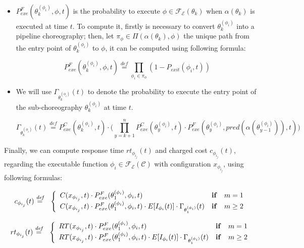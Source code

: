 \documentclass[12pt,a4paper]{report}
\newcommand{\mathDef}{\overset{\textit{def}}{=}}
\begin{document}
\begin{itemize}
	
	\item $P_{exe}^F(\theta^{(\phi_i)}_k, \phi, t)$ is the probability to execute $\phi \in \mathscr{F_E}(\theta_k)$ when $\alpha(\theta_k)$ is executed at time $t$. To compute it, firstly is necessary to convert $\theta^{(\phi_i)}_k$ into a pipeline choreography; then, let $\pi_{\phi} \in \Pi(\alpha(\theta_k),\phi)$ the unique path from the entry point of $\theta^{(\phi_i)}_k$ to $\phi$,  it can be computed using following formula:
		
	\begin{equation}
		P_{exe}^F(\theta^{(\phi_i)}_k, \phi, t) \mathDef \prod_{ \phi_i \in \pi_{\phi}} (1 - P_{exit}(\phi_i,t))
	\end{equation}
	


\item We will use $\Gamma_{\theta_k^{(\phi_{i})}}(t)$ to denote the probability to execute the entry point of the sub-choreography $\theta_k^{(\phi_{i})}$ at time $t$.

\begin{equation}
	\Gamma_{\theta_k^{(\phi_{i})}}(t) \mathDef P_{exe}^C(\theta^{(\phi_i)}_{k},t) \cdot \Bigg( \prod_{y = k + 1}^{n}  P_{exe}^C(\theta^{(\phi_i)}_{y},t) \cdot P_{exe}^{F}(\theta^{(\phi_i)}_{y}, pred(\alpha(\theta^{(\phi_i)}_{y-1})),t) \Bigg)
\end{equation}

\end{itemize}

Finally, we can compute response time $rt_{\phi_{i_{j}}}(t)$ and charged cost $c_{\phi_{i_{j}}}(t)$, regarding the executable function $\phi_i \in \mathscr{F_E}(\mathcal{C})$ with configuration $x_{\phi_{i_{j}}}$, using following formulas:

\begin{eqnarray}
	c_{\phi_{i_{j}}}(t) & \mathDef & \left\{ 
	\begin{array}{lcl}
		C(x_{\phi_{i_{j}}},t) \cdot P_{exe}^{F}(\theta^{(\phi_i)}_1, \phi_i,t) & \text{\textbf{if}} & m = 1 \\ 
		C(x_{\phi_{i_{j}}},t) \cdot P_{exe}^{F}(\theta^{(\phi_i)}_1, \phi_i,t) \cdot E[I_{\phi_i}(t)] \cdot \Gamma_{\theta_1^{(\phi_{i})}}(t) & \text{\textbf{if}} & m \geq 2 \\ 
	\end{array} \right.
\end{eqnarray}

\begin{eqnarray}
	rt_{\phi_{i_{j}}}(t) & \mathDef & \left\{ 
	\begin{array}{lcl}
	RT(x_{\phi_{i_{j}}},t) \cdot P_{exe}^{F}(\theta^{(\phi_i)}_1, \phi_i,t) & \text{\textbf{if}} & m = 1 \\ 
	RT(x_{\phi_{i_{j}}},t) \cdot P_{exe}^{F}(\theta^{(\phi_i)}_1, \phi_i,t) \cdot E[I_{\phi_i}(t)] \cdot \Gamma_{\theta_1^{(\phi_{i})}}(t) & \text{\textbf{if}} & m \geq 2 \\ 
\end{array} \right.
\end{eqnarray}
\end{document}
